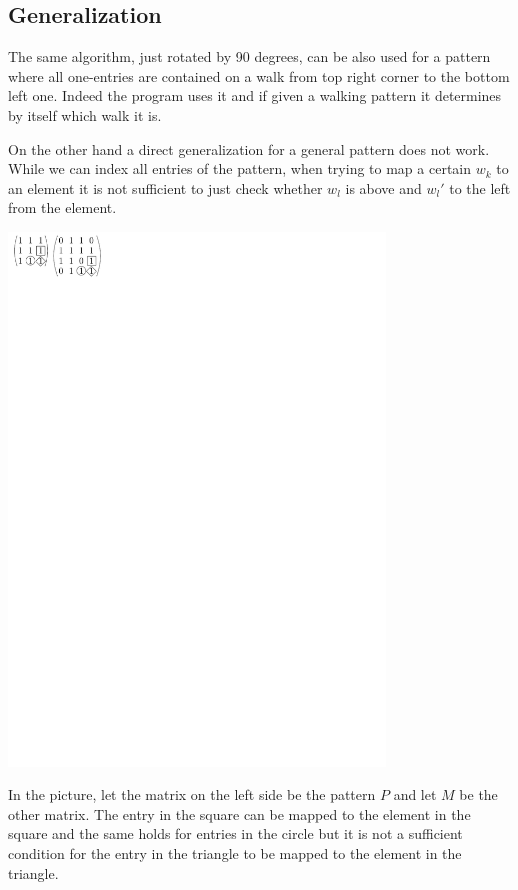 \subsection{Generalization}
The same algorithm, just rotated by 90 degrees, can be also used for a pattern where all one-entries are contained on a walk from top right corner to the bottom left one. Indeed the program uses it and if given a walking pattern it determines by itself which walk it is.

On the other hand a direct generalization for a general pattern does not work. While we can index all entries of the pattern, when trying to map a certain $w_k$ to an element it is not sufficient to just check whether $w_l$ is above and $w_l'$ to the left from the element.

\centerline{\mbox{\includegraphics[width=100mm]{../img/nogeneral.pdf}}}

In the picture, let the matrix on the left side be the pattern $P$ and let $M$ be the other matrix. The entry in the square can be mapped to the element in the square and the same holds for entries in the circle but it is not a sufficient condition for the entry in the triangle to be mapped to the element in the triangle.